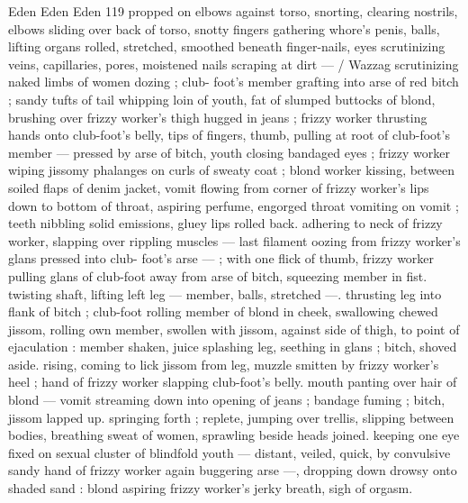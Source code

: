 Eden Eden Eden 119
propped on elbows against torso, snorting, clearing nostrils, elbows
sliding over back of torso, snotty fingers gathering whore's penis,
balls, lifting organs rolled, stretched, smoothed beneath finger-nails,
eyes scrutinizing veins, capillaries, pores, moistened nails scraping
at dirt — / Wazzag scrutinizing naked limbs of women dozing ; club-
foot's member grafting into arse of red bitch ; sandy tufts of tail
whipping loin of youth, fat of slumped buttocks of blond, brushing
over frizzy worker's thigh hugged in jeans ; frizzy worker thrusting
hands onto club-foot's belly, tips of fingers, thumb, pulling at root of
club-foot's member — pressed by arse of bitch, youth closing
bandaged eyes ; frizzy worker wiping jissomy phalanges on curls of
sweaty coat ; blond worker kissing, between soiled flaps of denim
jacket, vomit flowing from corner of frizzy worker's lips down to
bottom of throat, aspiring perfume, engorged throat vomiting on
vomit ; teeth nibbling solid emissions, gluey lips rolled back.
adhering to neck of frizzy worker, slapping over rippling muscles —
last filament oozing from frizzy worker's glans pressed into club-
foot's arse — ; with one flick of thumb, frizzy worker pulling glans
of club-foot away from arse of bitch, squeezing member in fist.
twisting shaft, lifting left leg — member, balls, stretched —.
thrusting leg into flank of bitch ; club-foot rolling member of blond
in cheek, swallowing chewed jissom, rolling own member, swollen
with jissom, against side of thigh, to point of ejaculation : member
shaken, juice splashing leg, seething in glans ; bitch, shoved aside.
rising, coming to lick jissom from leg, muzzle smitten by frizzy
worker's heel ; hand of frizzy worker slapping club-foot's belly.
mouth panting over hair of blond — vomit streaming down into
opening of jeans ; bandage fuming ; bitch, jissom lapped up.
springing forth ; replete, jumping over trellis, slipping between
bodies, breathing sweat of women, sprawling beside heads joined.
keeping one eye fixed on sexual cluster of blindfold youth —
distant, veiled, quick, by convulsive sandy hand of frizzy worker
again buggering arse —, dropping down drowsy onto shaded sand :
blond aspiring frizzy worker's jerky breath, sigh of orgasm.

